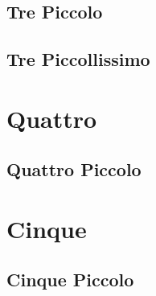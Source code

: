 \documentclass{article}
\begin{document}
\subsection{Tre Piccolo}
%
%



\subsection{Tre Piccollissimo}

{ }

 
{\vspace*{1cm}} \section{Quattro}

{ }

\subsection{Quattro Piccolo}

{ }


{\vspace*{.5cm}} 
\section{Cinque}

\subsection{Cinque Piccolo}

{ }

%
%

%



\printbibliography

%
\end{document}
